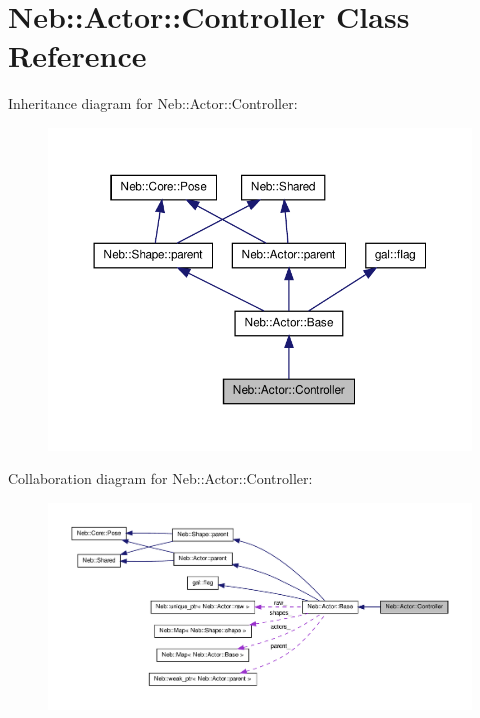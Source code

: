 \hypertarget{classNeb_1_1Actor_1_1Controller}{\section{\-Neb\-:\-:\-Actor\-:\-:\-Controller \-Class \-Reference}
\label{classNeb_1_1Actor_1_1Controller}
}


\-Inheritance diagram for \-Neb\-:\-:\-Actor\-:\-:\-Controller\-:
\nopagebreak
\begin{figure}[H]
\begin{center}
\leavevmode
\includegraphics[width=350pt]{classNeb_1_1Actor_1_1Controller__inherit__graph}
\end{center}
\end{figure}


\-Collaboration diagram for \-Neb\-:\-:\-Actor\-:\-:\-Controller\-:
\nopagebreak
\begin{figure}[H]
\begin{center}
\leavevmode
\includegraphics[width=350pt]{classNeb_1_1Actor_1_1Controller__coll__graph}
\end{center}
\end{figure}
